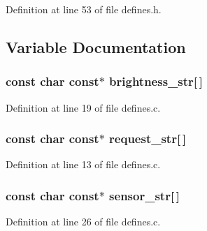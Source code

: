 Definition at line 53 of file defines.\-h.



\subsection{Variable Documentation}
\subsubsection[{brightness\-\_\-str}]{\setlength{\rightskip}{0pt plus 5cm}const char const$\ast$ brightness\-\_\-str[$\,$]}\label{defines_8h_aa66266408de980f8f70d74c36e24ef9c}


Definition at line 19 of file defines.\-c.

\subsubsection[{request\-\_\-str}]{\setlength{\rightskip}{0pt plus 5cm}const char const$\ast$ request\-\_\-str[$\,$]}\label{defines_8h_a3a6251b9cae8d7da3cec393b23df3228}


Definition at line 13 of file defines.\-c.

\subsubsection[{sensor\-\_\-str}]{\setlength{\rightskip}{0pt plus 5cm}const char const$\ast$ sensor\-\_\-str[$\,$]}\label{defines_8h_aa1c2df433b41481f1dee5aa6519df290}


Definition at line 26 of file defines.\-c.

